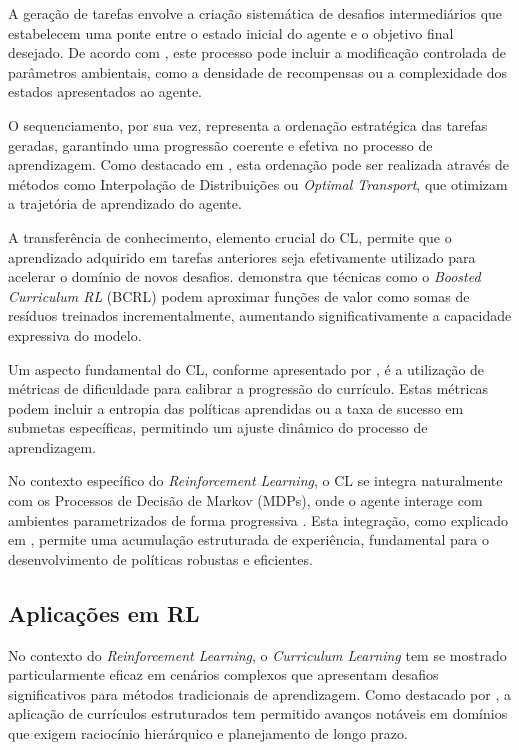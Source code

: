 A geração de tarefas envolve a criação sistemática de desafios intermediários que estabelecem uma ponte entre o estado inicial do agente e o objetivo final desejado. De acordo com \cite{curriculum_reinforcement_learning}, este processo pode incluir a modificação controlada de parâmetros ambientais, como a densidade de recompensas ou a complexidade dos estados apresentados ao agente.

O sequenciamento, por sua vez, representa a ordenação estratégica das tarefas geradas, garantindo uma progressão coerente e efetiva no processo de aprendizagem. Como destacado em \cite{curriculum}, esta ordenação pode ser realizada através de métodos como Interpolação de Distribuições ou \textit{Optimal Transport}, que otimizam a trajetória de aprendizado do agente.

A transferência de conhecimento, elemento crucial do CL, permite que o aprendizado adquirido em tarefas anteriores seja efetivamente utilizado para acelerar o domínio de novos desafios. \cite{diffusion_based_curriculum_reinforcement_learning} demonstra que técnicas como o \textit{Boosted Curriculum RL} (BCRL) podem aproximar funções de valor como somas de resíduos treinados incrementalmente, aumentando significativamente a capacidade expressiva do modelo.

Um aspecto fundamental do CL, conforme apresentado por \cite{curriculum}, é a utilização de métricas de dificuldade para calibrar a progressão do currículo. Estas métricas podem incluir a entropia das políticas aprendidas ou a taxa de sucesso em submetas específicas, permitindo um ajuste dinâmico do processo de aprendizagem.

No contexto específico do \textit{Reinforcement Learning}, o CL se integra naturalmente com os Processos de Decisão de Markov (MDPs), onde o agente interage com ambientes parametrizados de forma progressiva \cite{sutton}. Esta integração, como explicado em \cite{curriculum_reinforcement_learning}, permite uma acumulação estruturada de experiência, fundamental para o desenvolvimento de políticas robustas e eficientes.

\subsection{Aplicações em RL}
\label{subsec:curriculum_rl}

No contexto do \textit{Reinforcement Learning}, o \textit{Curriculum Learning} tem se mostrado particularmente eficaz em cenários complexos que apresentam desafios significativos para métodos tradicionais de aprendizagem. Como destacado por \cite{curriculum_reinforcement_learning}, a aplicação de currículos estruturados tem permitido avanços notáveis em domínios que exigem raciocínio hierárquico e planejamento de longo prazo.

